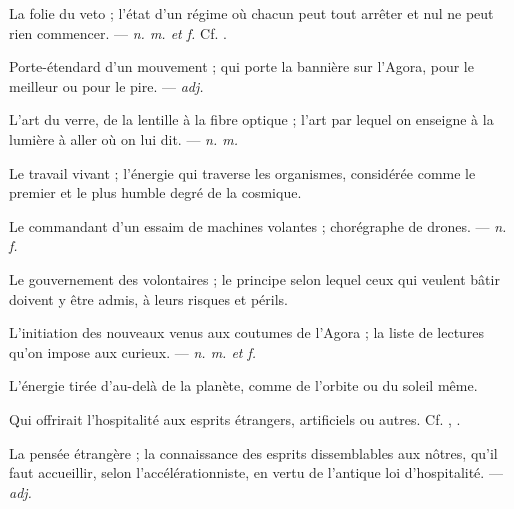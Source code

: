  La folie du veto ; l'état d'un régime où chacun peut tout arrêter et nul ne peut rien commencer. ---  \textit{n. m. et f.} Cf. .

 Porte-étendard d'un mouvement ; qui porte la bannière sur l'Agora, pour le meilleur ou pour le pire. ---  \textit{adj.}

 L'art du verre, de la lentille à la fibre optique ; l'art par lequel on enseigne à la lumière à aller où on lui dit. ---  \textit{n. m.}

 Le travail vivant ; l'énergie qui traverse les organismes, considérée comme le premier et le plus humble degré de la  cosmique.

 Le commandant d'un essaim de machines volantes ; chorégraphe de drones. ---  \textit{n. f.}

 Le gouvernement des volontaires ; le principe selon lequel ceux qui veulent bâtir doivent y être admis, à leurs risques et périls.

 L'initiation des nouveaux venus aux coutumes de l'Agora ; la liste de lectures qu'on impose aux curieux. ---  \textit{n. m. et f.}

 L'énergie tirée d'au-delà de la planète, comme de l'orbite ou du soleil même.

 Qui offrirait l'hospitalité aux esprits étrangers, artificiels ou autres. Cf. , .

 La pensée étrangère ; la connaissance des esprits dissemblables aux nôtres, qu'il faut accueillir, selon l'accélérationniste, en vertu de l'antique loi d'hospitalité. ---  \textit{adj.}

